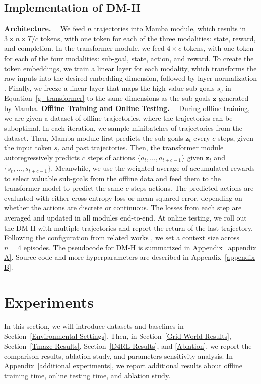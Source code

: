 \documentclass{article}
\begin{document}
\subsection{Implementation of DM-H}
\noindent\textbf{Architecture.}~~
We feed $n$ trajectories into Mamba module, which results in $3\times n\times T/c$ tokens, with one token for each of the three modalities: state, reward, and completion. In the transformer module, we feed $4\times c$ tokens, with one token for each of the four modalities: sub-goal, state, action, and reward. To create the token embeddings, we train a linear layer for each modality, which transforms the raw inputs into the desired embedding dimension, followed by layer normalization \cite{26}. Finally, we freeze a linear layer that maps the high-value sub-goals $s_g$ in Equation~\eqref{g_transformer} to the same dimensions as the sub-goals $\textbf{z}$ generated by Mamba.
\noindent\textbf{Offline Training and Online Testing.}~~
During offline training, we are given a dataset of offline trajectories, where the trajectories can be suboptimal.
In each iteration, we sample minibatches of trajectories from the dataset.
Then, Mamba module first predicts the sub-goals $\textbf{z}_t$ every $c$ steps, given the input token $s_t$ and past trajectories. Then, the transformer module autoregressively predicts $c$ steps of actions $\{a_t,\dots,a_{t+c-1}\}$ given $\textbf{z}_t$ and $\{s_t,\dots,s_{t+c-1}\}$.
Meanwhile, we use the weighted average of accumulated rewards to select valuable sub-goals from the offline data and feed them to the transformer model to predict the same $c$ steps actions.
The predicted actions are evaluated with either cross-entropy loss or mean-squared error, depending on whether the actions are discrete or continuous. The losses from each step are averaged and updated in all modules end-to-end. At online testing, we roll out the DM-H with multiple trajectories and report the return of the last trajectory. Following the configuration from related works \cite{1,8}, we set a context size across $n=4$ episodes.
The pseudocode for DM-H is summarized in Appendix~\ref{appendix A}. Source code and more hyperparameters are described in Appendix~\ref{appendix B}.
\section{Experiments}
\label{experiment}
In this section, we will introduce datasets and baselines in Section~\ref{Environmental Settings}.
Then, in Section~\ref{Grid World Results}, Section~\ref{Tmaze Results}, Section~\ref{D4RL Results}, and \ref{Ablation}, we report the comparison results, ablation study, and parameters sensitivity analysis. In Appendix~\ref{additional experiments}, we report additional results about offline training time, online testing time, and ablation study.
\end{document}
